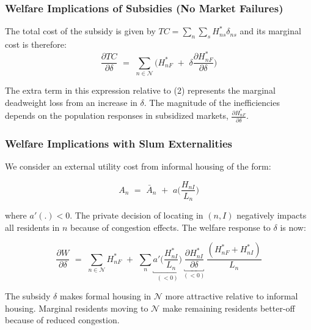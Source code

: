 \documentclass[aspectratio=149]{beamer}
\begin{document}

\begin{frame}
\frametitle{Welfare Implications of Subsidies (No Market Failures)}

The total cost of the subsidy is given by $TC = \sum_n\sum_s H^*_{ns}\delta_{ns}$ and its marginal cost is therefore:
\begin{equation*}
 \frac{\partial TC}{\partial \delta} \,\,=\,\, \sum_{n\in\mathcal{N}} \Big( H^*_{nF} \,\,+\,\, \delta\frac{\partial H^*_{nF}}{\partial \delta} \Big)
 \end{equation*} 

 \vspace{1mm}

 The extra term in this expression relative to (2) represents the marginal deadweight loss from an increase in $\delta$. The magnitude of the inefficiencies depends on the population responses in subsidized markets, $\frac{\partial H^*_{nF}}{\partial \delta}$.

\end{frame}


\begin{frame}
\frametitle{Welfare Implications with Slum Externalities}

We consider an external utility cost from informal housing of the form:

\begin{equation*}
A_n \,\,=\,\, \bar{A}_n \,\,+\,\, a\Big(\frac{H_{nI}}{L_n}\Big)
\end{equation*} 


where $a'(.)<0$. The private decision of locating in $(n,I)$ negatively impacts all residents in $n$ because of congestion effects. The welfare response to $\delta$ is now:

\begin{equation*}
\frac{\partial W}{\partial\delta} \,\,=\,\, \sum_{n\in\mathcal{N}} H^*_{nF} \,\,+\,\, \sum_{n} \underbracket{a'\Big(\frac{H^*_{nI}}{L_n}\Big)}_{(<0)}\,\underbracket{\frac{\partial H^*_{nI}}{\partial \delta}}_{(<0)}\,\frac{(H^*_{nF}+H^*_{nI})}{L_n}
\end{equation*}

The subsidy $\delta$ makes formal housing in $\mathcal{N}$ more attractive relative to informal housing. Marginal residents moving to $\mathcal{N}$ make remaining residents better-off because of reduced congestion.

\end{frame}
\end{document}
